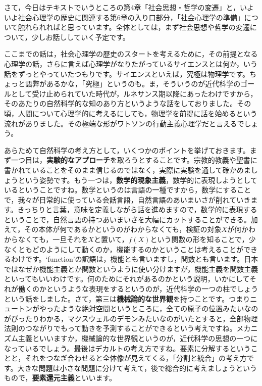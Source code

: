 \documentclass{ltjsbook}
\begin{document}
さて，今日はテキストでいうところの第4章「社会思想・哲学の変遷」と，いよいよ社会心理学の歴史に関連する第6章の入り口部分，「社会心理学の準備」について触れられればと思っています。全体としては，まず社会思想や哲学の変遷について，少しお話ししていく予定です。

ここまでの話は，社会心理学の歴史のスタートを考えるために，その前提となる心理学の話，さらに言えば心理学がなりたがっているサイエンスとは何か，いう話をずっとやっていたつもりです。サイエンスといえば，究極は物理学です。ちょっと語弊があるかな，「究極」というのも。ま，そういうのが近代科学のゴールとして受け止められていた時代が，ルネサンス期以降にあったわけですから，そのあたりの自然科学的な知のあり方というような話をしておりました。その頃，人間について心理学的に考えるにしても，物理学を前提に話を始めるという流れがありました。その極端な形がワトソンの行動主義心理学だと言えるでしょう。

あらためて自然科学の考え方として，いくつかのポイントを挙げておきます。まず一つ目は，\textbf{実験的なアプローチ}を取ろうとすることです。宗教的教義や聖書に書かれていることをそのまま信じるのではなく，実際に実験を通して確かめましょうという姿勢です。もう一つは，\textbf{数学的現象主義}，数学的に表現しようとしているということですね。数学というのは言語の一種ですから，数学にすることで，我々が日常的に使っている会話言語，自然言語のあいまいさが削れていきます。きっちりと言葉，意味を定義しながら話を進めますので，数学的に表現するということで，自然言語の持つあいまいさを大幅にカットすることができる。加えて，その本体が何であるかというのがわからなくても，検証の対象$X$が何かわからなくても，一旦それを$X$と置いて，$f(X)$という関数の形を知ることで，少なくともどのようにして動くのか，機能するのかということは考えることができるわけです。`function'の訳語は，機能とも言いますし，関数とも言います。日本ではなぜか機能主義とか関数というように使い分けますが，機能主義を関数主義といってもいいわけです。何のためにそれがあるのかという説明，いかにしてそれが働くのかというような表現をするというのが，近代科学の一つの柱でしょうという話をしました。さて，第三は\textbf{機械論的な世界観}を持つことです。つまりニュートンがやったような絶対空間というところに，全ての原子の位置みたいなのがぴったりわかる，マクスウェルのデモンみたいなのがいたとすると，全部物理法則のつながりでもって動きを予測することができるという考えですね。メカニズム主義といいますか，機械論的な世界観というのが，近代科学の思想の一つになっているでしょう。最後はデカルトの考え方ですね。要素に分解するということと，それをつなぎ合わせると全体像が見えてくる，「分割と統合」の考え方です。大きな問題は小さな問題に分けて考えて，後で総合的に考えましょうというもので，\textbf{要素還元主義}といいます。
\end{document}
